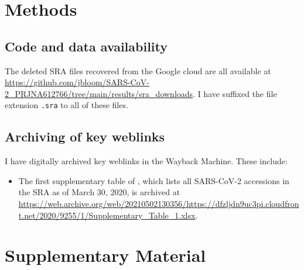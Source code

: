 \documentclass[9pt,twocolumn,twoside]{gsajnl_modified}
\begin{document}
\section{Methods}

\subsection{Code and data availability}
The deleted SRA files recovered from the Google cloud are all available at  \url{https://github.com/jbloom/SARS-CoV-2_PRJNA612766/tree/main/results/sra_downloads}.
I have suffixed the file extension \texttt{.sra} to all of these files.

\subsection{Archiving of key weblinks}
I have digitally archived key weblinks in the Wayback Machine.
These include:
\begin{itemize}
\item The first supplementary table of \citet{farkas2020insights}, which lists all SARS-CoV-2 accessions in the SRA as of March 30, 2020, is archived at \url{https://web.archive.org/web/20210502130356/https://dfzljdn9uc3pi.cloudfront.net/2020/9255/1/Supplementary_Table_1.xlsx}. 
\end{itemize}



\clearpage
\onecolumn
\renewcommand{\thepage}{S\arabic{page}}
\setcounter{page}{1}
\renewcommand{\thefigure}{S\arabic{figure}}
\setcounter{figure}{1}

\section{Supplementary Material}
\end{document}
